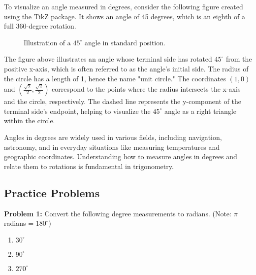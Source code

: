 \documentclass[a4paper,12pt]{book}
\begin{document}
To visualize an angle measured in degrees, consider the following figure created using the TikZ package. It shows an angle of 45 degrees, which is an eighth of a full 360-degree rotation.

\begin{figure}[h]
\centering
{}
\caption{Illustration of a \(45^\circ\) angle in standard position.}
\label{fig:45degangle}
\end{figure}

The figure above illustrates an angle whose terminal side has rotated \(45^\circ\) from the positive x-axis, which is often referred to as the angle's initial side. The radius of the circle has a length of 1, hence the name "unit circle." The coordinates \((1,0)\) and \((\frac{\sqrt{2}}{2},\frac{\sqrt{2}}{2})\) correspond to the points where the radius intersects the x-axis and the circle, respectively. The dashed line represents the y-component of the terminal side's endpoint, helping to visualize the \(45^\circ\) angle as a right triangle within the circle.

Angles in degrees are widely used in various fields, including navigation, astronomy, and in everyday situations like measuring temperatures and geographic coordinates. Understanding how to measure angles in degrees and relate them to rotations is fundamental in trigonometry.

\subsection*{Practice Problems}
\label{subsec:practice_problems_degree}

\textbf{Problem 1:} Convert the following degree measurements to radians. (Note: \( \pi \) radians = \( 180^\circ \))
\begin{enumerate}[label=\alph*.]
  \item \( 30^\circ \)
  \item \( 90^\circ \)
  \item \( 270^\circ \)
\end{enumerate}
\end{document}
